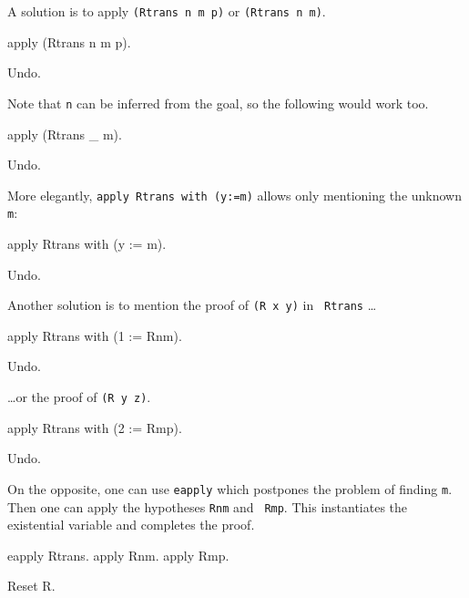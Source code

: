 \begin{coq_example*}
A solution is to apply {\tt (Rtrans n m p)} or {\tt (Rtrans n m)}.

\begin{coq_example}
apply (Rtrans n m p).
\end{coq_example}

\begin{coq_eval}
Undo.
\end{coq_eval}

Note that {\tt n} can be inferred from the goal, so the following would
work too.

\begin{coq_example*}
apply (Rtrans _ m).
\end{coq_example*}
\begin{coq_eval}
Undo.
\end{coq_eval}

More elegantly, {\tt apply Rtrans with (y:=m)} allows only mentioning
the unknown {\tt m}:

\begin{coq_example*}
apply Rtrans with (y := m).
\end{coq_example*}
\begin{coq_eval}
Undo.
\end{coq_eval}

Another solution is to mention the proof of {\tt (R x y)} in {\tt
Rtrans} \ldots

\begin{coq_example}
apply Rtrans with (1 := Rnm).
\end{coq_example}
\begin{coq_eval}
Undo.
\end{coq_eval}

\ldots or the proof of {\tt (R y z)}.

\begin{coq_example}
apply Rtrans with (2 := Rmp).
\end{coq_example}
\begin{coq_eval}
Undo.
\end{coq_eval}

On the opposite, one can use {\tt eapply} which postpones the problem
of finding {\tt m}. Then one can apply the hypotheses {\tt Rnm} and {\tt
Rmp}. This instantiates the existential variable and completes the proof.

\begin{coq_example}
eapply Rtrans.
apply Rnm.
apply Rmp.
\end{coq_example}

\begin{coq_eval}
Reset R.
\end{coq_eval}


\end{coq_example*}

